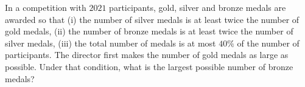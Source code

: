 In a competition with $2021$ participants, gold, silver and bronze medals are awarded so that
(i) the number of silver medals is at least twice the number of gold medals,
(ii) the number of bronze medals is at least twice the number of silver medals,
(iii) the total number of medals is at most $40\%$ of the number of participants.
The director first makes the number of gold medals as large as possible. Under that condition, what is the largest possible number of bronze medals?
